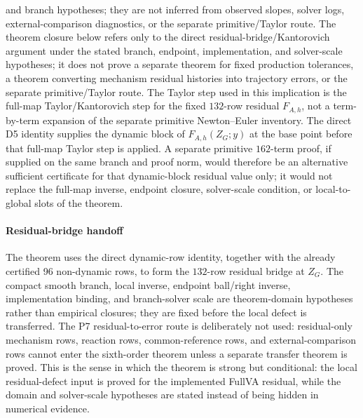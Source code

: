 \documentclass[preprint,12pt]{elsarticle}
\begin{document}
and branch hypotheses; they are not inferred from observed slopes, solver
logs, external-comparison diagnostics, or the separate primitive/Taylor route.
The theorem closure below refers only to the direct residual-bridge/Kantorovich
argument under the stated branch, endpoint, implementation, and solver-scale
hypotheses; it does not prove a separate theorem for fixed production
tolerances, a theorem converting mechanism residual histories into trajectory
errors, or the separate primitive/Taylor route.
The Taylor step used in this implication is the full-map
Taylor/Kantorovich step for the fixed \(132\)-row residual \(F_{A,h}\), not a
term-by-term expansion of the separate primitive Newton--Euler inventory.  The
direct D5 identity supplies the dynamic block of \(F_{A,h}(Z_G;y)\) at the
base point before that full-map Taylor step is applied.  A separate primitive
\(162\)-term proof, if supplied on the same branch and proof norm, would
therefore be an alternative sufficient certificate for that dynamic-block
residual value only; it would not replace the
full-map inverse, endpoint closure, solver-scale condition, or local-to-global
slots of the theorem.

\paragraph{Residual-bridge handoff}
The theorem uses the direct dynamic-row identity,
together with the already certified 96 non-dynamic rows, to form the
\(132\)-row residual bridge at \(Z_G\).  The compact smooth branch,
local inverse, endpoint ball/right inverse, implementation binding, and
branch-solver scale are theorem-domain hypotheses rather than empirical
closures; they are fixed before the local defect is transferred.  The
P7 residual-to-error route is deliberately not
used: residual-only mechanism rows, reaction rows, common-reference rows, and
external-comparison rows cannot enter the sixth-order theorem unless a
separate transfer theorem is proved.  This is the sense in which the theorem
is strong but conditional: the local residual-defect input is proved for the
implemented FullVA residual, while the domain and solver-scale hypotheses are
stated instead of being hidden in numerical evidence.
\end{document}
